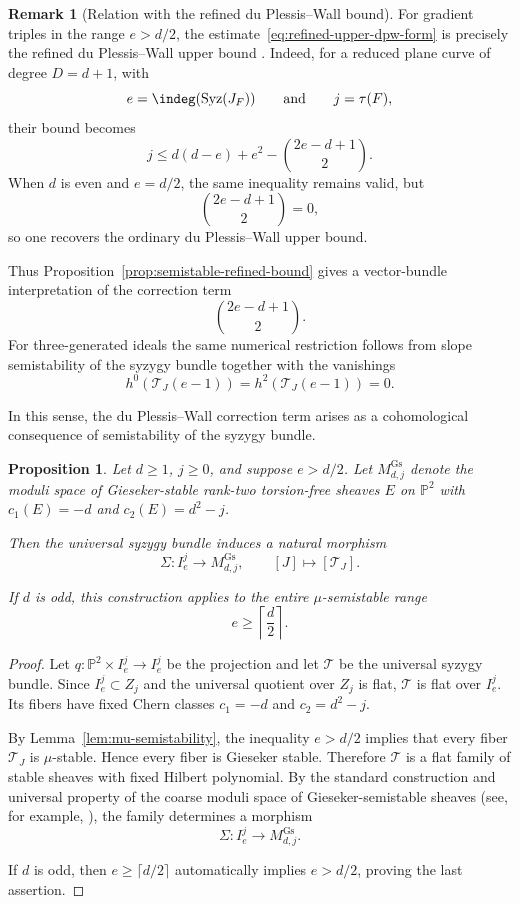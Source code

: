 \documentclass[11pt]{amsart} %
\newcommand{\lar}{\longrightarrow}
\newtheorem{Proposition}[Theorem]{Proposition}
\theoremstyle{definition}
\newtheorem{Remark}[Theorem]{Remark}
\def\syz{\mbox{\rm Syz}}
\def\NZQ{\mathbb}               %
\def\PP{{\NZQ P}}
\def\T{{\mathcal T}}
\begin{document}
\begin{Remark}[Relation with the refined du Plessis--Wall bound]
\label{rmk:refined-dpw-semistability}
For gradient triples in the range \(e> d/2\), the estimate~\eqref{eq:refined-upper-dpw-form} is precisely the
refined du Plessis--Wall upper bound
\cite[Theorem~3.2]{CTC-Plessis}. Indeed, for a reduced plane curve
of degree $D=d+1$, with
\[
e=\indeg(\syz(J_F))
\qquad\text{and}\qquad
j=\tau(F),
\]
their bound becomes
\[
j
\leq
d(d-e)+e^2-\binom{2e-d+1}{2}.
\]
When $d$ is even and $e=d/2$, the same inequality remains valid, but
\[
\binom{2e-d+1}{2}=0,
\]
so one recovers the ordinary du Plessis--Wall upper bound.

Thus Proposition~\ref{prop:semistable-refined-bound} gives a
vector-bundle interpretation of the correction term
\[
\binom{2e-d+1}{2}.
\]
For three-generated ideals the same numerical restriction
follows from slope semistability of the syzygy bundle together with
the vanishings 
\[
h^0(\T_J(e-1))=h^2(\T_J(e-1))=0.
\]

In this sense, the du Plessis--Wall correction term arises as a
cohomological consequence of semistability of the syzygy bundle.
\end{Remark}

\begin{Proposition}\label{prop:morphism-gieseker}
Let $d\geq1$, $j\geq0$, and suppose \(
e> d/2\). Let \(M^{\mathrm{Gs}}_{d,j}\) denote the moduli space of Gieseker-stable rank-two torsion-free sheaves $E$ on $\PP^2$ with $c_1(E) = -d$ and $c_2(E) = d^2-j$.

Then the universal syzygy bundle induces a natural morphism
\[
\Sigma:
I_e^j
\longrightarrow
M^{\mathrm{Gs}}_{d,j},
\qquad
[J]\longmapsto[\T_J].
\]

If $d$ is odd, this construction applies to the entire
$\mu$-semistable range
\[
e\geq\left\lceil\frac d2\right\rceil.
\]
\end{Proposition}

\begin{proof}
Let \(q:\PP^2\times I_e^j\lar I_e^j\) be the projection and let $\mathscr T$ be the universal syzygy
bundle. Since $I_e^j\subset Z_j$ and the universal quotient over
$Z_j$ is flat, $\mathscr T$ is flat over $I_e^j$. Its fibers have
fixed Chern classes \(c_1=-d\) and \(c_2=d^2-j\).

By Lemma~\ref{lem:mu-semistability}, the inequality $e>d/2$ implies that every fiber $\T_J$ is $\mu$-stable. Hence every fiber is Gieseker stable. Therefore $\mathscr T$ is a
flat family of stable sheaves with fixed Hilbert polynomial. By the
standard construction and universal property of the coarse moduli
space of Gieseker-semistable sheaves
(see, for example, \cite[Chapter~4]{huybrechts2010geometry}),
the family determines a morphism
\[
\Sigma:I_e^j\longrightarrow M^{\mathrm{Gs}}_{d,j}.
\]

If $d$ is odd, then \(e\geq \lceil d/2 \rceil\)
automatically implies $e>d/2$, proving the last assertion.
\end{proof}
\end{document}
